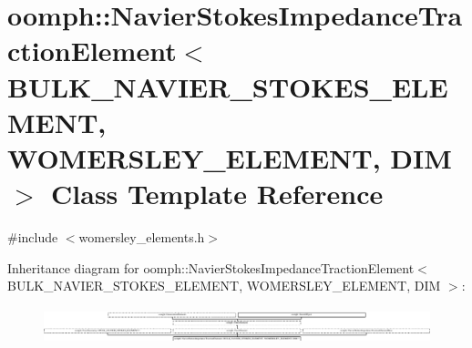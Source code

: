 \hypertarget{classoomph_1_1NavierStokesImpedanceTractionElement}{}\section{oomph\+:\+:Navier\+Stokes\+Impedance\+Traction\+Element$<$ B\+U\+L\+K\+\_\+\+N\+A\+V\+I\+E\+R\+\_\+\+S\+T\+O\+K\+E\+S\+\_\+\+E\+L\+E\+M\+E\+NT, W\+O\+M\+E\+R\+S\+L\+E\+Y\+\_\+\+E\+L\+E\+M\+E\+NT, D\+IM $>$ Class Template Reference}
\label{classoomph_1_1NavierStokesImpedanceTractionElement}


{\ttfamily \#include $<$womersley\+\_\+elements.\+h$>$}

Inheritance diagram for oomph\+:\+:Navier\+Stokes\+Impedance\+Traction\+Element$<$ B\+U\+L\+K\+\_\+\+N\+A\+V\+I\+E\+R\+\_\+\+S\+T\+O\+K\+E\+S\+\_\+\+E\+L\+E\+M\+E\+NT, W\+O\+M\+E\+R\+S\+L\+E\+Y\+\_\+\+E\+L\+E\+M\+E\+NT, D\+IM $>$\+:\begin{figure}[H]
\begin{center}
\leavevmode
\includegraphics[height=1.060606cm]{classoomph_1_1NavierStokesImpedanceTractionElement}
\end{center}
\end{figure}

